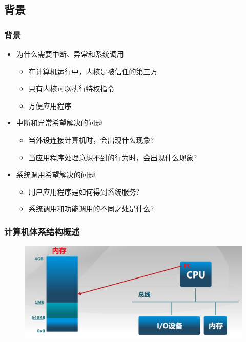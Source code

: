 \subsection{背景} %
\begin{frame}
	\frametitle{背景}
    \begin{itemize}
        \item 为什么需要中断、异常和系统调用
        \begin{itemize}
            \item 在计算机运行中，内核是被信任的第三方
            \item 只有内核可以执行特权指令
            \item 方便应用程序
        \end{itemize}
        \item 中断和异常希望解决的问题
        \begin{itemize}
            \item 当外设连接计算机时，会出现什么现象?
            \item 当应用程序处理意想不到的行为时，会出现什么现象?
        \end{itemize}
        \item 系统调用希望解决的问题
        \begin{itemize}
            \item 用户应用程序是如何得到系统服务?
            \item 系统调用和功能调用的不同之处是什么?
        \end{itemize}
    \end{itemize}
\end{frame}
\begin{frame}
	\frametitle{计算机体系结构概述}
\begin{figure}
    \includegraphics[width=1.0\linewidth]{architecture}
\end{figure}

\end{frame}
